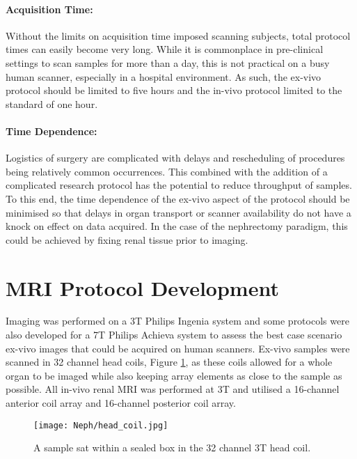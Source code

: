 \paragraph{Acquisition Time:} Without the limits on acquisition time imposed scanning subjects, total protocol times can easily become very long. While it is commonplace in pre-clinical settings to scan samples for more than a day, this is not practical on a busy human scanner, especially in a hospital environment. As such, the ex-vivo protocol should be limited to five hours and the in-vivo protocol limited to the standard of one hour.

\paragraph{Time Dependence:} Logistics of surgery are complicated with delays and rescheduling of procedures being relatively common occurrences. This combined with the addition of a complicated research protocol has the potential to reduce throughput of samples. To this end, the time dependence of the ex-vivo aspect of the protocol should be minimised so that delays in organ transport or scanner availability do not have a knock on effect on data acquired. In the case of the nephrectomy paradigm, this could be achieved by fixing renal tissue prior to imaging.


\section{MRI Protocol Development}

Imaging was performed on a 3T Philips Ingenia system and some protocols were also developed for a 7T Philips Achieva system to assess the best case scenario ex-vivo images that could be acquired on human scanners. Ex-vivo samples were scanned in 32 channel head coils, Figure \ref{fig:ex_head_coil}, as these coils allowed for a whole organ to be imaged while also keeping array elements as close to the sample as possible. All in-vivo renal \ac{MRI} was performed at 3T and utilised a 16-channel anterior coil array and 16-channel posterior coil array.

\begin{figure}[H]
	\centering
	\texttt{[image: Neph/head\_coil.jpg]}
	\caption{A sample sat within a sealed box in the 32 channel 3T head coil.}
	\label{fig:ex_head_coil}	
\end{figure}

